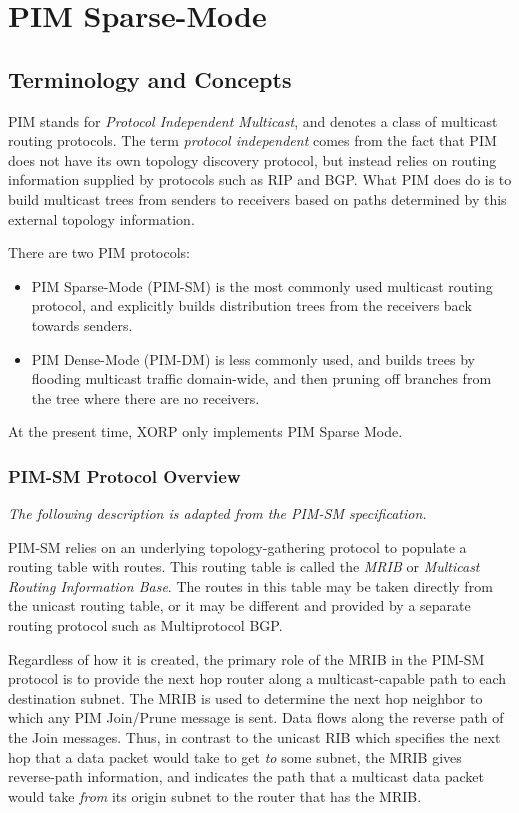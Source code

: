 \chapter{PIM Sparse-Mode}
\label{pimsm}

\section{Terminology and Concepts}

PIM stands for {\it Protocol Independent Multicast}, and denotes a
class of multicast routing protocols.  The term {\it protocol
independent} comes from the fact that PIM does not have its own
topology discovery protocol, but instead relies on routing information
supplied by protocols such as RIP and BGP.  What PIM does do is to
build multicast trees from senders to receivers based on paths
determined by this external topology information.  

There are two PIM protocols:
\begin{itemize}
\item PIM Sparse-Mode (PIM-SM) is the most commonly used multicast
  routing protocol, and explicitly builds distribution trees from the
  receivers back towards senders.
\item PIM Dense-Mode (PIM-DM) is less commonly used, and builds trees
  by flooding multicast traffic domain-wide, and then pruning off
  branches from the tree where there are no receivers.  
\end{itemize}
At the present time, XORP only implements PIM Sparse Mode.

\subsection{PIM-SM Protocol Overview}

{\it The following description is adapted from the PIM-SM
  specification.  }

PIM-SM relies on an underlying topology-gathering protocol to populate a
routing table with routes.  This routing table is called the {\it MRIB} or
{\it Multicast Routing Information Base}.  The routes in this table may be
taken directly from the unicast routing table, or it may be
different and provided by a separate routing protocol such as
Multiprotocol BGP.

Regardless of how it is created, the primary role of the MRIB in the
PIM-SM protocol
is to provide the next hop router along a multicast-capable
path to each destination subnet.
The MRIB is used to determine the next hop neighbor to which any PIM
Join/Prune message is sent.
Data flows along the reverse path of the Join messages.
Thus, in contrast to the unicast RIB which specifies the
next hop that a data packet would take to get {\it to} some subnet,
the MRIB gives reverse-path information, and indicates the path that
a multicast data packet would take {\it from} 
its origin subnet to the router that has the MRIB.  

